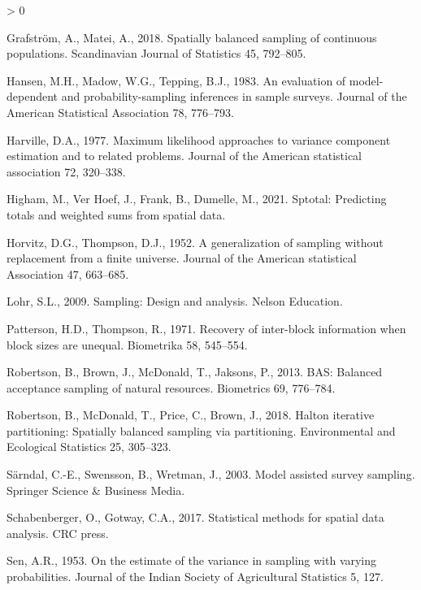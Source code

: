 \documentclass[]{elsarticle} %
\newlength{\cslhangindent}
\newenvironment{CSLReferences}[2] %
 {%
  \setlength{\parindent}{0pt}
  \ifodd #1 \everypar{\setlength{\hangindent}{\cslhangindent}}\ignorespaces\fi
  \ifnum #2 > 0
  \setlength{\parskip}{#2\baselineskip}
  \fi
 }%
 {}
\begin{document}
\begin{CSLReferences}{1}{0}
\leavevmode\hypertarget{ref-grafstrom2018spatially}{}%
Grafström, A., Matei, A., 2018. Spatially balanced sampling of
continuous populations. Scandinavian Journal of Statistics 45, 792--805.

\leavevmode\hypertarget{ref-hansen1983evaluation}{}%
Hansen, M.H., Madow, W.G., Tepping, B.J., 1983. An evaluation of
model-dependent and probability-sampling inferences in sample surveys.
Journal of the American Statistical Association 78, 776--793.

\leavevmode\hypertarget{ref-harville1977maximum}{}%
Harville, D.A., 1977. Maximum likelihood approaches to variance
component estimation and to related problems. Journal of the American
statistical association 72, 320--338.

\leavevmode\hypertarget{ref-higham2021sptotal}{}%
Higham, M., Ver Hoef, J., Frank, B., Dumelle, M., 2021. Sptotal:
Predicting totals and weighted sums from spatial data.

\leavevmode\hypertarget{ref-horvitz1952generalization}{}%
Horvitz, D.G., Thompson, D.J., 1952. A generalization of sampling
without replacement from a finite universe. Journal of the American
statistical Association 47, 663--685.

\leavevmode\hypertarget{ref-lohr2009sampling}{}%
Lohr, S.L., 2009. Sampling: Design and analysis. Nelson Education.

\leavevmode\hypertarget{ref-patterson1971recovery}{}%
Patterson, H.D., Thompson, R., 1971. Recovery of inter-block information
when block sizes are unequal. Biometrika 58, 545--554.

\leavevmode\hypertarget{ref-robertson2013bas}{}%
Robertson, B., Brown, J., McDonald, T., Jaksons, P., 2013. BAS: Balanced
acceptance sampling of natural resources. Biometrics 69, 776--784.

\leavevmode\hypertarget{ref-robertson2018halton}{}%
Robertson, B., McDonald, T., Price, C., Brown, J., 2018. Halton
iterative partitioning: Spatially balanced sampling via partitioning.
Environmental and Ecological Statistics 25, 305--323.

\leavevmode\hypertarget{ref-sarndal2003model}{}%
Särndal, C.-E., Swensson, B., Wretman, J., 2003. Model assisted survey
sampling. Springer Science \& Business Media.

\leavevmode\hypertarget{ref-schabenberger2017statistical}{}%
Schabenberger, O., Gotway, C.A., 2017. Statistical methods for spatial
data analysis. CRC press.

\leavevmode\hypertarget{ref-sen1953estimate}{}%
Sen, A.R., 1953. On the estimate of the variance in sampling with
varying probabilities. Journal of the Indian Society of Agricultural
Statistics 5, 127.


\end{CSLReferences}
\end{document}

